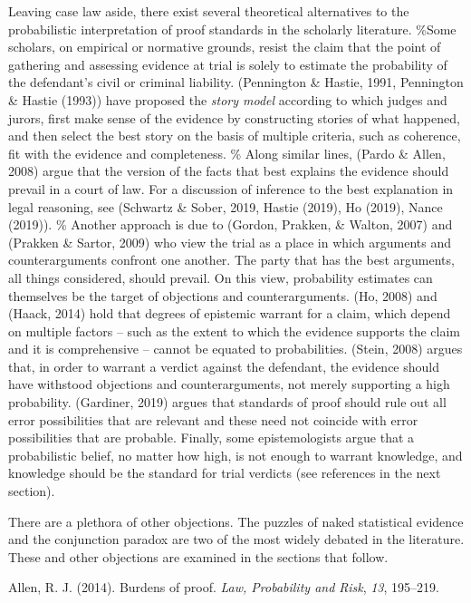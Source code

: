 \documentclass[10pt,dvipsnames]{scrartcl}
\begin{document}
Leaving case law aside, there exist several theoretical alternatives to
the probabilistic interpretation of proof standards in the scholarly
literature. \%Some scholars, on empirical or normative grounds, resist
the claim that the point of gathering and assessing evidence at trial is
solely to estimate the probability of the defendant's civil or criminal
liability. (Pennington \& Hastie, 1991, Pennington \& Hastie (1993))
have proposed the \textit{story model} according to which judges and
jurors, first make sense of the evidence by constructing stories of what
happened, and then select the best story on the basis of multiple
criteria, such as coherence, fit with the evidence and completeness. \%
Along similar lines, (Pardo \& Allen, 2008) argue that the version of
the facts that best explains the evidence should prevail in a court of
law. For a discussion of inference to the best explanation in legal
reasoning, see (Schwartz \& Sober, 2019, Hastie (2019), Ho (2019), Nance
(2019)). \% Another approach is due to (Gordon, Prakken, \& Walton,
2007) and (Prakken \& Sartor, 2009) who view the trial as a place in
which arguments and counterarguments confront one another. The party
that has the best arguments, all things considered, should prevail. On
this view, probability estimates can themselves be the target of
objections and counterarguments. (Ho, 2008) and (Haack, 2014) hold that
degrees of epistemic warrant for a claim, which depend on multiple
factors -- such as the extent to which the evidence supports the claim
and it is comprehensive -- cannot be equated to probabilities. (Stein,
2008) argues that, in order to warrant a verdict against the defendant,
the evidence should have withstood objections and counterarguments, not
merely supporting a high probability. (Gardiner, 2019) argues that
standards of proof should rule out all error possibilities that are
relevant and these need not coincide with error possibilities that are
probable. Finally, some epistemologists argue that a probabilistic
belief, no matter how high, is not enough to warrant knowledge, and
knowledge should be the standard for trial verdicts (see references in
the next section).

There are a plethora of other objections. The puzzles of naked
statistical evidence and the conjunction paradox are two of the most
widely debated in the literature. These and other objections are
examined in the sections that follow.

\hypertarget{refs}{}
\hypertarget{ref-allen2014}{}
Allen, R. J. (2014). Burdens of proof. \emph{Law, Probability and Risk},
\emph{13}, 195--219.
\end{document}
